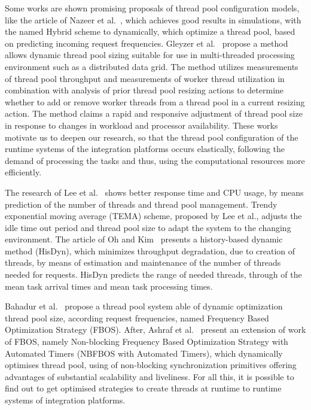 Some works are shown promising proposals of thread pool configuration models, like the article of Nazeer et al.~\cite{nazeer2016}, which achieves good results in simulations, with the named Hybrid scheme to dynamically, which optimize a thread pool, based on predicting incoming request frequencies. Gleyzer et al.~\cite{gleyzer2017} propose a method allows dynamic thread pool sizing suitable for use in multi-threaded processing environment such as a distributed data grid. The method utilizes measurements of thread pool throughput and measurements of worker thread utilization in combination with analysis of prior thread pool resizing actions to determine whether to add or remove worker threads from a thread pool in a current resizing action. The method claims a rapid and responsive adjustment of thread pool size in response to changes in workload and processor availability. These works motivate us to deepen our research, so that the thread pool configuration of the runtime systems of the integration platforms occurs elastically, following the demand of processing the tasks and thus, using the computational resources more efficiently.

The research of Lee et al.~\cite{lee2011} shows better response time and CPU usage, by means prediction of the number of threads and thread pool management. Trendy exponential moving average (TEMA) scheme, proposed by Lee et al., adjusts the idle time out period and thread pool size to adapt the system to the changing environment. The article of Oh and Kim~\cite{oh2013} presents a history-based dynamic method (HisDyn), which minimizes throughput degradation, due to creation of threads, by means of estimation and maintenance of the number of threads needed for requests. HisDyn predicts the range of needed threads, through of the mean task arrival times and mean task processing times.

Bahadur et al.~\cite{bahadur2014} propose a thread pool system able of dynamic optimization thread pool size, according request frequencies, named Frequency Based Optimization Strategy (FBOS). After, Ashraf et al.~\cite{ashraf2016} present an extension of work of FBOS, namely Non-blocking Frequency Based Optimization Strategy with Automated Timers (NBFBOS with Automated Timers), which dynamically optimises thread pool, using of non-blocking synchronization primitives offering advantages of substantial scalability and liveliness. For all this, it is possible to find out to get optimised strategies to create threads at runtime to runtime systems of integration platforms.

